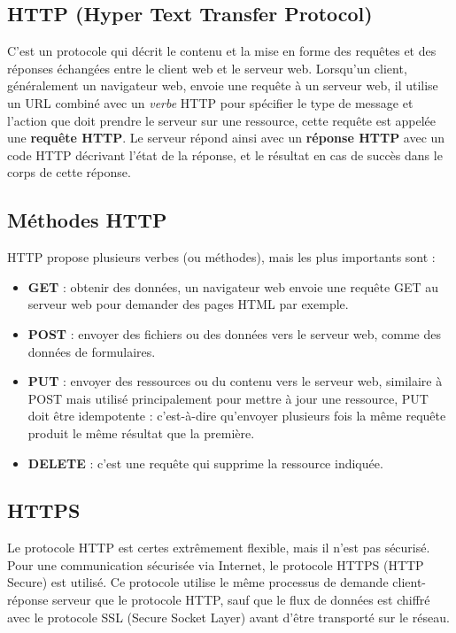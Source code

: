\subsection{HTTP (Hyper Text Transfer Protocol)}
C'est un protocole qui décrit le contenu et la mise en forme des requêtes et des réponses échangées entre le client web et le serveur web. 
Lorsqu'un client, généralement un navigateur web, envoie une requête à un serveur web, il utilise un URL combiné avec un \emph{verbe} HTTP pour spécifier le type de message et l'action que doit prendre le serveur sur une ressource, cette requête est appelée une \textbf{requête HTTP}. Le serveur répond ainsi avec un \textbf{réponse HTTP} avec un code HTTP décrivant l'état de la réponse, et le résultat en cas de succès dans le corps de cette réponse.

\subsection{Méthodes HTTP}
HTTP propose plusieurs verbes (ou méthodes), mais les plus importants sont : 
\begin{itemize}
	\item \textbf{GET} : obtenir des données, un navigateur web envoie une requête GET au serveur web pour demander des pages HTML par exemple.
	\item \textbf{POST} : envoyer des fichiers ou des données vers le serveur web, comme des données de formulaires.
	\item \textbf{PUT} : envoyer des ressources ou du contenu vers le serveur web, similaire à POST mais utilisé principalement pour mettre à jour une ressource, PUT doit être idempotente : c'est-à-dire qu'envoyer plusieurs fois la même requête produit le même résultat que la première.
	\item \textbf{DELETE} : c'est une requête  qui supprime la ressource indiquée.
\end{itemize}

\subsection{HTTPS}
Le protocole HTTP est certes extrêmement flexible, mais il n'est pas sécurisé.
Pour une communication sécurisée via Internet, le protocole HTTPS (HTTP Secure) est utilisé. \newline
Ce protocole utilise le même processus de demande client-réponse serveur que le protocole HTTP, sauf que le flux de données est chiffré avec le protocole SSL (Secure Socket Layer) avant d'être transporté sur le réseau.

